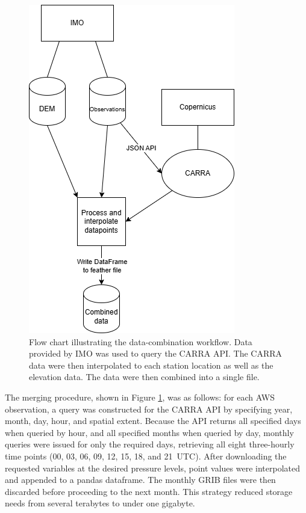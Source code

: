 \begin{figure}[h]
  \centering
  \includegraphics[scale=0.6]{Figures/data_combination.drawio.png}
  \caption[Flow chart illustrating the data-combination workflow.]{Flow chart illustrating the data-combination workflow. Data provided by IMO was used to query the CARRA API. The CARRA data were then interpolated to each station location as well as the elevation data. The data were then combined into a single file.}
  \label{fig:data_preprocessing_flow_chart}
\end{figure}

The merging procedure, shown in Figure \ref{fig:data_preprocessing_flow_chart}, was as follows: for each AWS observation, a query was constructed for the CARRA API by specifying year, month, day, hour, and spatial extent. Because the API returns all specified days when queried by hour, and all specified months when queried by day, monthly queries were issued for only the required days, retrieving all eight three-hourly time points (00, 03, 06, 09, 12, 15, 18, and 21~UTC). After downloading the requested variables at the desired pressure levels, point values were interpolated and appended to a pandas dataframe. The monthly GRIB files were then discarded before proceeding to the next month. This strategy reduced storage needs from several terabytes to under one gigabyte.

